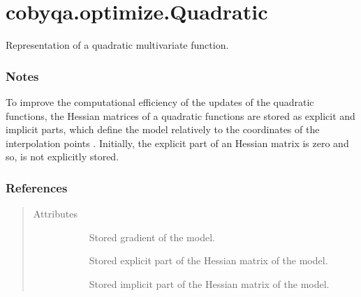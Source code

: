 \documentclass[letterpaper,10pt,english]{sphinxmanual}
\begin{document}
\section{cobyqa.optimize.Quadratic}
\label{\detokenize{refs/generated/cobyqa.optimize.Quadratic:cobyqa-optimize-quadratic}}\label{\detokenize{refs/generated/cobyqa.optimize.Quadratic::doc}}

\begin{fulllineitems}
\label{\detokenize{refs/generated/cobyqa.optimize.Quadratic:cobyqa.optimize.Quadratic}}
\sphinxAtStartPar
Representation of a quadratic multivariate function.
\subsubsection*{Notes}

\sphinxAtStartPar
To improve the computational efficiency of the updates of the quadratic
functions, the Hessian matrices of a quadratic functions are stored as
explicit and implicit parts, which define the model relatively to the
coordinates of the interpolation points . Initially, the explicit part
of an Hessian matrix is zero and so, is not explicitly stored.
\subsubsection*{References}

\sphinxAtStartPar
{}
\begin{quote}\begin{description}
\item[{Attributes}] \leavevmode\begin{description}
\item[{}] \leavevmode
\sphinxAtStartPar
Stored gradient of the model.

\item[{}] \leavevmode
\sphinxAtStartPar
Stored explicit part of the Hessian matrix of the model.

\item[{}] \leavevmode
\sphinxAtStartPar
Stored implicit part of the Hessian matrix of the model.


\end{description}
\end{description}
\end{quote}
\end{fulllineitems}
\end{document}
